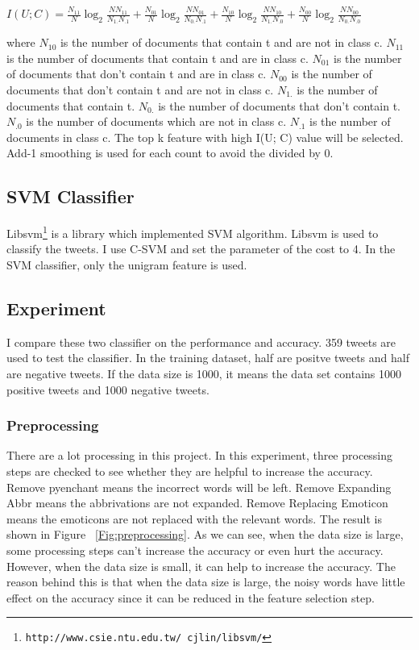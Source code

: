 \documentclass{article}
\begin{document}
\begin{center}
$I(U; C) = \frac{N_{11}}{N} \log_2 \frac{N N_{11}}{N_{1.}N_{.1}} + \frac{N_{01}}{N} \log_2 \frac{N N_{01}}{N_{0.}N_{.1}} + \frac{N_{10}}{N} \log_2 \frac{N N_{10}}{N_{1.}N_{.0}} + \frac{N_{00}}{N}\log_2 \frac{N N_{00}}{N_{0.}N_{.0}}$
\end{center}

\noindent where $N_{10}$ is the number of documents that contain t and are not in class c. $N_{11}$ is the number of documents that contain t and are in class c. $N_{01}$ is the number of documents that don't contain t and are in class c. $N_{00}$ is the number of documents that don't contain t and are not in class c. $N_{1.}$ is the number of documents that contain t. $N_{0.}$ is the number of documents that don't contain t. $N_{.0}$ is the number of documents which are not in class c. $N_{.1}$ is the number of documents in class c. The top k feature with high I(U; C) value will be selected.\\
Add-1 smoothing is used for each count to avoid the divided by 0.
\subsection{SVM Classifier}
Libsvm\footnote{\texttt{\scriptsize{http://www.csie.ntu.edu.tw/~cjlin/libsvm/‎‎}}} is a library which implemented SVM algorithm. Libsvm is used to classify the tweets. ‎I use C-SVM and set the parameter of the cost to 4. In the SVM classifier, only the unigram feature is used.
\subsection{Experiment}
I compare these two classifier on the performance and accuracy. 359 tweets are used to test the classifier. In the training dataset, half are positve tweets and half are negative tweets. If the data size is 1000, it means the data set contains 1000 positive tweets and 1000 negative tweets. 
\subsubsection{Preprocessing}
There are a lot processing in this project. In this experiment, three processing steps are checked to see whether they are helpful to increase the accuracy. Remove pyenchant means the incorrect words will be left. Remove Expanding Abbr means the abbrivations are not expanded. Remove Replacing Emoticon means the emoticons are not replaced with the relevant words. The result is shown in Figure ~\ref{Fig:preprocessing}. As we can see, when the data size is large, some processing steps can't increase the accuracy or even hurt the accuracy. However, when the data size is small, it can help to increase the accuracy. The reason behind this is that when the data size is large, the noisy words have little effect on the accuracy since it can be reduced in the feature selection step.
\end{document}
